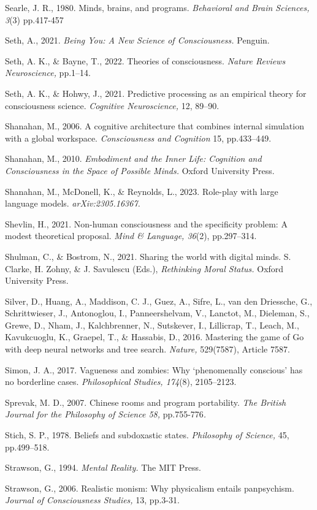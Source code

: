 \documentclass[12pt]{article}
\begin{document}
Searle, J. R., 1980. Minds, brains, and programs. \emph{Behavioral and
Brain Sciences, 3}(3) pp.417-457

Seth, A., 2021. \emph{Being You: A New Science of Consciousness.}
Penguin.

Seth, A. K., \& Bayne, T., 2022. Theories of consciousness. \emph{Nature
Reviews Neuroscience,} pp.1--14.

Seth, A. K., \& Hohwy, J., 2021. Predictive processing as an empirical
theory for consciousness science. \emph{Cognitive Neuroscience,} 12,
89--90.

Shanahan, M., 2006. A cognitive architecture that combines internal
simulation with a global workspace. \emph{Consciousness and Cognition}
15, pp.433--449.

Shanahan, M., 2010. \emph{Embodiment and the Inner Life: Cognition and
Consciousness in the Space of Possible Minds.} Oxford University Press.

Shanahan, M., McDonell, K., \& Reynolds, L., 2023. Role-play with large
language models. \emph{arXiv:2305.16367.}

Shevlin, H., 2021. Non-human consciousness and the specificity problem:
A modest theoretical proposal. \emph{Mind \& Language, 36}(2),
pp.297--314.

Shulman, C., \& Bostrom, N., 2021. Sharing the world with digital minds.
S. Clarke, H. Zohny, \& J. Savulescu (Eds.), \emph{Rethinking Moral
Status.} Oxford University Press.

Silver, D., Huang, A., Maddison, C. J., Guez, A., Sifre, L., van den
Driessche, G., Schrittwieser, J., Antonoglou, I., Panneershelvam, V.,
Lanctot, M., Dieleman, S., Grewe, D., Nham, J., Kalchbrenner, N.,
Sutskever, I., Lillicrap, T., Leach, M., Kavukcuoglu, K., Graepel, T.,
\& Hassabis, D., 2016. Mastering the game of Go with deep neural
networks and tree search. \emph{Nature,} 529(7587), Article 7587.

Simon, J. A., 2017. Vagueness and zombies: Why `phenomenally conscious'
has no borderline cases. \emph{Philosophical Studies, 174}(8),
2105--2123.

Sprevak, M. D., 2007. Chinese rooms and program portability. \emph{The
British Journal for the Philosophy of Science 58,} pp.755-776\emph{.}

Stich, S. P., 1978. Beliefs and subdoxastic states. \emph{Philosophy of
Science,} 45, pp.499--518.

Strawson, G., 1994. \emph{Mental Reality.} The MIT Press.

Strawson, G., 2006. Realistic monism: Why physicalism entails
panpsychism. \emph{Journal of Consciousness Studies,} 13, pp.3-31.
\end{document}
